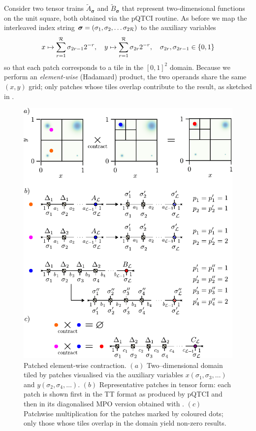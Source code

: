 Consider two tensor trains \(\widetilde{A}_{\boldsymbol{\sigma}}\) and \(\widetilde{B}_{\boldsymbol{\sigma}}\) that represent two-dimensional functions on the unit square, both obtained via the pQTCI routine.  
As before we map the interleaved index string
\(\boldsymbol{\sigma}=(\sigma_{1},\sigma_{2},\dots \sigma_{2\mathcal{R}})\) to the auxiliary variables
\begin{equation}
    x \mapsto \sum_{r=1}^{\mathcal{R}}\sigma_{2r-1}2^{-r}, \quad y \mapsto \sum_{r=1}^{\mathcal{R}}\sigma_{2r}2^{-r}, \quad \sigma_{2r}, \sigma_{2r-1} \in \{0,1\}
\end{equation}
so that each patch corresponds to a tile in the \([0,1]^{2}\) domain.  
Because we perform an \emph{element-wise} (Hadamard) product, the two operands share the same \((x,y)\)  grid; only patches whose tiles overlap contribute to
the result, as sketched in . 
\begin{figure}
    \centering    
    \includegraphics{figures/PatchElemenContr.pdf}
    \caption{Patched element-wise contraction. $(a)$  Two–dimensional domain tiled by patches visualised via the auxiliary variables
    \(x(\sigma_{1},\sigma_{3},\dots)\) and
    \(y(\sigma_{2},\sigma_{4},\dots)\). $(b)$  Representative patches in tensor form: each patch is shown first in the TT format as produced by pQTCI and then in its diagonalised MPO version obtained with . $(c)$  Patchwise multiplication for the patches marked by coloured dots; only those whose tiles overlap in the domain yield non-zero results. } 
    \label{fig:patchElemContr}
\end{figure}

